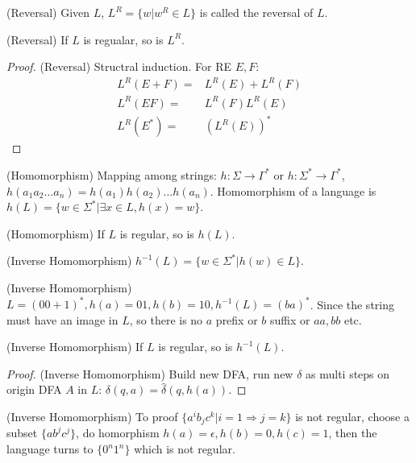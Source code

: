     \begin{definition}
        \label{definition:Reversal}
        (Reversal) Given $L$, $L^{R}=\{w|w^{R}\in L\}$ is called the reversal of $L$.
    \end{definition}
    \begin{theorem}
        \label{theorem:Reversal}
        (Reversal) If $L$ is regualar, so is $L^{R}$.
    \end{theorem}
    \begin{proof}
        \label{proof:Reversal}
        (Reversal) Structral induction. For RE $E,F$:
        \begin{align}
            L^{R}(E+F)=&L^{R}(E)+L^{R}(F)\nonumber\\
            L^{R}(EF)=&L^{R}(F)L^{R}(E)\nonumber\\
            L^{R}(E^{*})=&(L^{R}(E))^{*}\nonumber
        \end{align}
    \end{proof}
    \begin{definition}
        \label{definition:Homomorphism}
        (Homomorphism) Mapping among strings: $h:\Sigma \rightarrow \Gamma^{*}$ or $h: \Sigma^{*}\rightarrow \Gamma^{*}$, $h(a_1a_2\ldots a_n)=h(a_1)h(a_2)\ldots h(a_n)$. Homomorphism of a language is $h(L)=\{w\in \Sigma^{*}|\exists x\in L,h(x)=w\}$.
    \end{definition}
    \begin{theorem}
        \label{theorem:Homomorphism}
        (Homomorphism) If $L$ is regular, so is $h(L)$.
    \end{theorem}
    \begin{definition}
        \label{definition:Inverse Homomorphism}
        (Inverse Homomorphism) $h^{-1}(L)=\{w\in \Sigma^{*}|h(w)\in L\}$.
    \end{definition}
    \begin{example}
        \label{example:Inverse Homomorphism}
        (Inverse Homomorphism) $L=(00+1)^{*},h(a)=01,h(b)=10,h^{-1}(L)=(ba)^{*}$. Since the string must have an image in $L$, so there is no $a$ prefix or $b$ suffix or $aa,bb$ etc.
    \end{example}
    \begin{theorem}
        \label{theorem:Inverse Homomorphism}
        (Inverse Homomorphism) If $L$ is regular, so is $h^{-1}(L)$.
    \end{theorem}
    \begin{proof}
        \label{proof:Inverse Homomorphism}
        (Inverse Homomorphism) Build new DFA, run new $\delta$ as multi steps on origin DFA $A$ in $L$: $\delta(q,a)=\hat{\delta}(q,h(a))$.
    \end{proof}
    \begin{example}
        \label{example:Inverse Homomorphism:02}
        (Inverse Homomorphism) To proof $\{a^{i}b_{j}c^{k}|i=1\Rightarrow j=k\}$ is not regular, choose a subset $\{ab^{j}c^{j}\}$, do homorphism $h(a)=\epsilon,h(b)=0,h(c)=1$, then the language turns to $\{0^{n}1^{n}\}$ which is not regular.
    \end{example}
